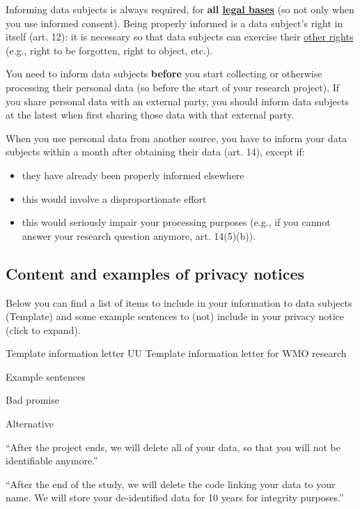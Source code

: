 \documentclass[
]{book}
\providecommand{\tightlist}{%
  \setlength{\itemsep}{0pt}\setlength{\parskip}{0pt}}
\begin{document}
Informing data subjects is always required, for \textbf{all \protect\hyperlink{legal-basis}{legal bases}}
(so not only when you use informed consent). Being properly informed is a data
subject's right in itself (art. 12):
it is necessary so that data subjects can exercise their \protect\hyperlink{data-subject-rights}{other rights}
(e.g., right to be forgotten, right to object, etc.).

You need to inform data subjects \textbf{before} you start collecting or otherwise
processing their personal data (so before the start of your research project).
If you share personal data with an external party, you should inform data
subjects at the latest when first sharing those data with that external party.

When you use personal data from another source, you have to inform your data
subjects within a month after obtaining their data
(art. 14), except
if:

\begin{itemize}
\tightlist
\item
  they have already been properly informed elsewhere
\item
  this would involve a disproportionate effort
\item
  this would seriously impair your processing purposes (e.g., if you cannot
  answer your research question anymore,
  art. 14(5)(b)).
\end{itemize}

\hypertarget{content-and-examples-of-privacy-notices}{%
\subsection{Content and examples of privacy notices}\label{content-and-examples-of-privacy-notices}}

Below you can find a list of items to include in your information to data
subjects (Template) and some example sentences to (not) include in your privacy
notice (click to expand).

Template information letter UU
Template information letter for WMO research

Example sentences

Bad promise

Alternative

``After the project ends, we will delete all of your data, so that you will not be identifiable anymore.''

``After the end of the study, we will delete the code linking your data to your name. We will store your de-identified data for 10 years for integrity purposes.''
\end{document}
